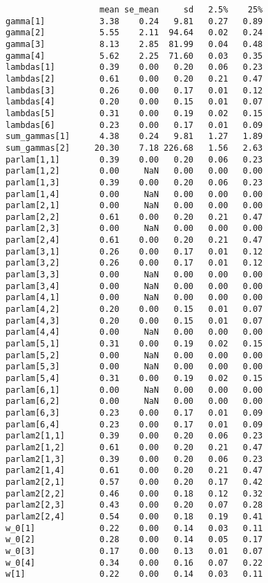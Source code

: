 \documentclass[
  12pt,
]{book}
\begin{document}
\begin{verbatim}
                   mean se_mean     sd   2.5%    25%
gamma[1]           3.38    0.24   9.81   0.27   0.89
gamma[2]           5.55    2.11  94.64   0.02   0.24
gamma[3]           8.13    2.85  81.99   0.04   0.48
gamma[4]           5.62    2.25  71.60   0.03   0.35
lambdas[1]         0.39    0.00   0.20   0.06   0.23
lambdas[2]         0.61    0.00   0.20   0.21   0.47
lambdas[3]         0.26    0.00   0.17   0.01   0.12
lambdas[4]         0.20    0.00   0.15   0.01   0.07
lambdas[5]         0.31    0.00   0.19   0.02   0.15
lambdas[6]         0.23    0.00   0.17   0.01   0.09
sum_gammas[1]      4.38    0.24   9.81   1.27   1.89
sum_gammas[2]     20.30    7.18 226.68   1.56   2.63
parlam[1,1]        0.39    0.00   0.20   0.06   0.23
parlam[1,2]        0.00     NaN   0.00   0.00   0.00
parlam[1,3]        0.39    0.00   0.20   0.06   0.23
parlam[1,4]        0.00     NaN   0.00   0.00   0.00
parlam[2,1]        0.00     NaN   0.00   0.00   0.00
parlam[2,2]        0.61    0.00   0.20   0.21   0.47
parlam[2,3]        0.00     NaN   0.00   0.00   0.00
parlam[2,4]        0.61    0.00   0.20   0.21   0.47
parlam[3,1]        0.26    0.00   0.17   0.01   0.12
parlam[3,2]        0.26    0.00   0.17   0.01   0.12
parlam[3,3]        0.00     NaN   0.00   0.00   0.00
parlam[3,4]        0.00     NaN   0.00   0.00   0.00
parlam[4,1]        0.00     NaN   0.00   0.00   0.00
parlam[4,2]        0.20    0.00   0.15   0.01   0.07
parlam[4,3]        0.20    0.00   0.15   0.01   0.07
parlam[4,4]        0.00     NaN   0.00   0.00   0.00
parlam[5,1]        0.31    0.00   0.19   0.02   0.15
parlam[5,2]        0.00     NaN   0.00   0.00   0.00
parlam[5,3]        0.00     NaN   0.00   0.00   0.00
parlam[5,4]        0.31    0.00   0.19   0.02   0.15
parlam[6,1]        0.00     NaN   0.00   0.00   0.00
parlam[6,2]        0.00     NaN   0.00   0.00   0.00
parlam[6,3]        0.23    0.00   0.17   0.01   0.09
parlam[6,4]        0.23    0.00   0.17   0.01   0.09
parlam2[1,1]       0.39    0.00   0.20   0.06   0.23
parlam2[1,2]       0.61    0.00   0.20   0.21   0.47
parlam2[1,3]       0.39    0.00   0.20   0.06   0.23
parlam2[1,4]       0.61    0.00   0.20   0.21   0.47
parlam2[2,1]       0.57    0.00   0.20   0.17   0.42
parlam2[2,2]       0.46    0.00   0.18   0.12   0.32
parlam2[2,3]       0.43    0.00   0.20   0.07   0.28
parlam2[2,4]       0.54    0.00   0.18   0.19   0.41
w_0[1]             0.22    0.00   0.14   0.03   0.11
w_0[2]             0.28    0.00   0.14   0.05   0.17
w_0[3]             0.17    0.00   0.13   0.01   0.07
w_0[4]             0.34    0.00   0.16   0.07   0.22
w[1]               0.22    0.00   0.14   0.03   0.11

\end{verbatim}
\end{document}
